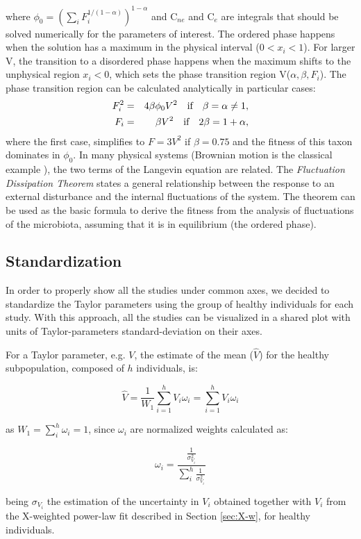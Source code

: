 where $\phi_0 = (\sum_i F_i^{1/(1-\alpha)})^{1-\alpha}$ and C$_{ne}$ and C$_{e}$ are integrals that should be solved numerically for the parameters of interest. The ordered phase happens when the solution has a maximum in the physical interval ($0<x_i<1$). For larger V, the transition to a disordered phase happens when the maximum shifts to the unphysical region $x_i<0$, which sets the phase transition region V($\alpha,\beta,F_i$). The phase transition region can be calculated analytically in particular cases:
\begin{eqnarray*}
F_i^2 &=& 4 \beta \phi_0 V^2\quad \textrm{if} \quad  \beta = \alpha \neq 1,\\
F_i &=& \beta V^2\quad \textrm{if} \quad  2\beta = 1+\alpha,
\notag
\end{eqnarray*}
where the first case, simplifies to $F= 3 V^2$ if $\beta = 0.75$ and the fitness of this taxon dominates in $\phi_0$. 
In many physical systems (Brownian motion is the classical example \cite{Einstein}), the two terms of the Langevin equation are related.  The \emph{Fluctuation Dissipation Theorem} states a general relationship between the response to an external disturbance and the internal fluctuations of the system\cite{FD}. The theorem can be used as the basic formula to derive the fitness from the analysis of fluctuations 
of the microbiota, assuming that it is in equilibrium (the ordered phase).  

\subsection*{Standardization} \label{sec:stan}
In order to properly show all the studies under common axes, we decided to standardize the Taylor parameters using the group of healthy individuals for each study. With this approach, all the studies can be visualized in a shared plot with units of Taylor-parameters standard-deviation on their axes.

For a Taylor parameter, e.g. $V$, the estimate of the mean ($\widehat{V}$) for the healthy subpopulation, composed of $h$ individuals, is:
\begin{linenomath}
$$\widehat{V} = \frac{1}{W_1}\sum_{i=1}^h V_i \omega_i=\sum_{i=1}^h V_i \omega_i$$
\end{linenomath}
as $W_1=\sum_i^h \omega_i=1$, since $\omega_i$ are normalized weights calculated as:
\begin{linenomath}
$$\omega_i = \frac{\frac{1}{\sigma^2_{V_i}}}{\sum_i^h\frac{1}{\sigma^2_{V_i}}}$$
\end{linenomath}
being $\sigma_{V_i}$ the estimation of the uncertainty in $V_i$ obtained together with $V_i$ from the X-weighted power-law fit described in Section \ref{sec:X-w}, for healthy individuals.

